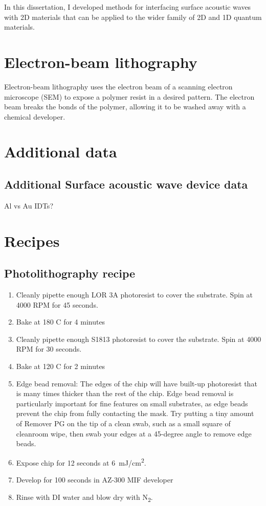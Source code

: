 \documentclass[double,12pt,1in]{beavtex}
\begin{document}
In this dissertation, I developed methods for interfacing surface acoustic waves with 2D materials that can be applied to the wider family of 2D and 1D quantum materials. 

\pagebreak




\pagebreak

\appendix

\chapter{Electron-beam lithography} \label{electron-beam lithography} 
Electron-beam lithography uses the electron beam of a scanning electron microscope (SEM) to expose a polymer resist in a desired pattern. The electron beam breaks the bonds of the polymer, allowing it to be washed away with a chemical developer. 
\chapter{Additional data}

\section{Additional Surface acoustic wave device data}
Al vs Au IDTs?




\chapter{Recipes}

\section{Photolithography recipe} \label{photolithography recipe}

\begin{enumerate}
    \item Cleanly pipette enough LOR 3A photoresist to cover the substrate. Spin at 4000 RPM for 45 seconds.
    \item Bake at 180 C for 4 minutes
    \item Cleanly pipette enough S1813 photoresist to cover the substrate. Spin at 4000 RPM for 30 seconds.
    \item Bake at 120 C for 2 minutes
    \item Edge bead removal: The edges of the chip will have built-up photoresist that is many times thicker than the rest of the chip. Edge bead removal is particularly important for fine features on small substrates, as edge beads prevent the chip from fully contacting the mask. Try putting a tiny amount of Remover PG on the tip of a clean swab, such as a small square of cleanroom wipe, then swab your edges at a 45-degree angle to remove edge beads. 
    \item Expose chip for 12 seconds at \SI{6}{\milli\joule/\centi\meter^2}.
    \item Develop for 100 seconds in AZ-300 MIF developer
    \item Rinse with DI water and blow dry with N\textsubscript{2}.
\end{enumerate}
\end{document}
